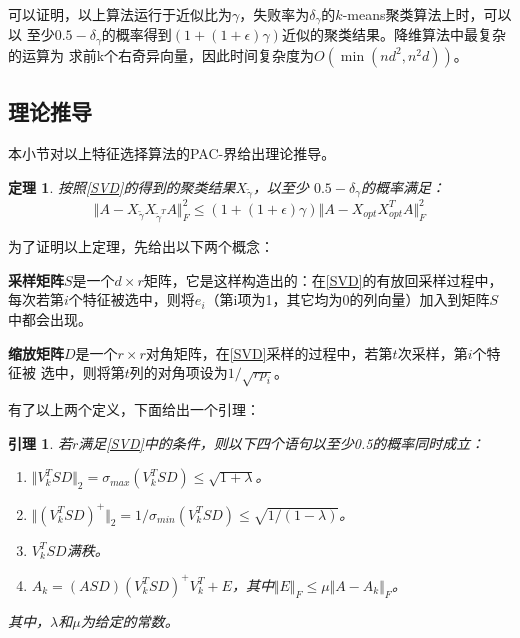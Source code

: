 \documentclass{ctexart}
\begin{document}
    可以证明，以上算法运行于近似比为$\gamma$，失败率为$\delta_\gamma$的$k$-means聚类算法上时，可以以
    至少$0.5-\delta_\gamma$的概率得到$(1+(1+\epsilon)\gamma)$近似的聚类结果。降维算法中最复杂的运算为
    求前k个右奇异向量，因此时间复杂度为$O(\min(nd^2, n^2d))$。

    \subsection{理论推导}
    本小节对以上特征选择算法的PAC-界给出理论推导\cite{boutsidis2009unsupervised,boutsidis2014randomized}。

    \newtheorem{thm}{\bf 定理}[]
    \begin{thm}
    \label{thmsvd}
        按照\autoref{SVD}的得到的聚类结果$X_{\tilde{\gamma}}$，以至少
        $0.5-\delta_\gamma$的概率满足：
        $$
            \Vert A - X_{\tilde{\gamma}} X_{\tilde{\gamma}^T} A \Vert_F^2 \leq (1 + ( 1+\epsilon ) \gamma ) \Vert A - X_{opt} X_{opt}^T A \Vert_F^2
        $$
    \end{thm}

    为了证明以上定理，先给出以下两个概念：

    \textbf{采样矩阵}$S$是一个$d \times r$矩阵，它是这样构造出的：在\autoref{SVD}的有放回采样过程中，
    每次若第$i$个特征被选中，则将$e_i$（第i项为1，其它均为0的列向量）加入到矩阵$S$中都会出现。

    \textbf{缩放矩阵}$D$是一个$r \times r$对角矩阵，在\autoref{SVD}采样的过程中，若第$t$次采样，第$i$个特征被
    选中，则将第$t$列的对角项设为$1 / \sqrt{rp_i}$。

    有了以上两个定义，下面给出一个引理\cite{boutsidis2009unsupervised}：
    \newtheorem{lemma}{\bf 引理}[]
    \begin{lemma}
    \label{lmsvd}
        若$r$满足\autoref{SVD}中的条件，则以下四个语句以至少0.5的概率同时成立：
        \begin{enumerate}
            \item $\Vert V_k^T S D \Vert_2 = \sigma_{max}(V_k^T S D) \leq \sqrt{1 + \lambda}$。
            \item $\Vert (V_k^T S D)^+ \Vert_2 = 1 / \sigma_{min}(V_k^T S D) \leq \sqrt{1 / (1 - \lambda)}$。
            \item $V_k^T S D$满秩。
            \item $A_k = (ASD) (V_k^T SD)^+ V_k^T + E$，其中$\Vert E \Vert_F \leq \mu \Vert A - A_k \Vert_F$。
        \end{enumerate}
        其中，$\lambda$和$\mu$为给定的常数\cite{boutsidis2009unsupervised}。

    \end{lemma}
\end{document}
